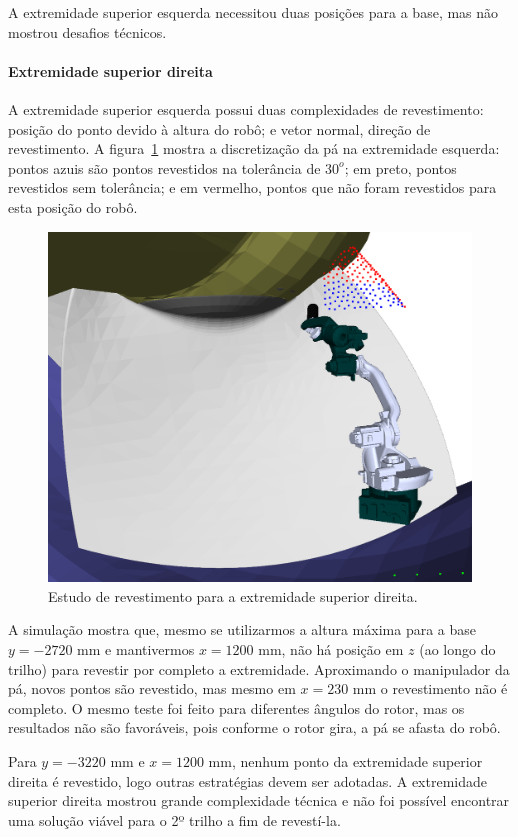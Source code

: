 A extremidade superior esquerda necessitou duas posições para a base, mas não
mostrou desafios técnicos.

\paragraph{Extremidade superior direita}

A extremidade superior esquerda possui duas complexidades de revestimento:
posição do ponto devido à altura do robô; e vetor normal, direção de
revestimento. A figura~\ref{fig::shoulderright} mostra a discretização da pá na
extremidade esquerda: pontos azuis são pontos revestidos na tolerância de $30^o$; em preto, pontos revestidos sem tolerância; e em vermelho, pontos que
não foram revestidos para esta posição do robô.

\begin{figure}[!ht]
	\centering	
	\includegraphics[width=0.7\columnwidth]{method/figs/shoulderright.png}
	\caption{Estudo de revestimento para a extremidade superior direita.}
	\label{fig::shoulderright}
\end{figure}

A simulação mostra que, mesmo se utilizarmos a altura máxima para a base
$y=-2720$ mm e mantivermos $x=1200$ mm, não há posição em $z$ (ao longo do
trilho) para revestir por completo a extremidade. Aproximando o manipulador da
pá, novos pontos são revestido, mas mesmo em $x=230$ mm o
revestimento não é completo. O mesmo teste foi feito para diferentes
ângulos do rotor, mas os resultados não são favoráveis, pois conforme o rotor
gira, a pá se afasta do robô.

Para $y=-3220$ mm e $x=1200$ mm, nenhum ponto da extremidade superior direita é
revestido, logo outras estratégias devem ser adotadas. A extremidade superior
direita mostrou grande complexidade técnica e não foi possível encontrar uma
solução viável para o 2º trilho a fim de revestí-la.

